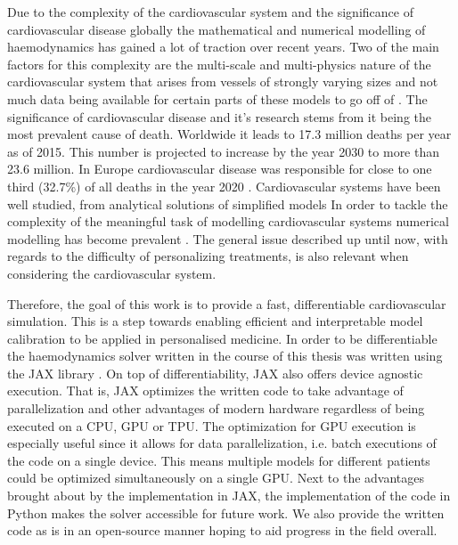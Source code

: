 \documentclass[a4paper, oneside]{discothesis}
\begin{document}
Due to the complexity of the cardiovascular system and the significance of cardiovascular disease globally the mathematical and numerical modelling of haemodynamics has gained a lot of traction over recent years.
Two of the main factors for this complexity are the multi-scale and multi-physics nature of the cardiovascular system that arises from vessels of strongly varying sizes and not much data being available for certain parts of these models to go off of \cite{quarteroni2016geometric}.
The significance of cardiovascular disease and it's research stems from it being the most prevalent cause of death.
Worldwide it leads to 17.3 million deaths per year as of 2015.
This number is projected to increase by the year 2030 to more than 23.6 million. \cite{update2015heart}
In Europe cardiovascular disease was responsible for close to one third (32.7\%) of all deaths in the year 2020 \cite{Coelho2020}.
Cardiovascular systems have been well studied, from analytical solutions of simplified models
In order to tackle the complexity of the meaningful task of modelling cardiovascular systems numerical modelling has become prevalent \cite{formaggia2009multiscale,quarteroni2016geometric,black2020p14,el2018investigating,qureshi2014numerical,reichold2009vascular}.
The general issue described up until now, with regards to the difficulty of personalizing treatments, is also relevant when considering the cardiovascular system.

Therefore, the goal of this work is to provide a fast, differentiable cardiovascular simulation.
This is a step towards enabling efficient and interpretable model calibration to be applied in personalised medicine.
In order to be differentiable the haemodynamics solver written in the course of this thesis was written using the JAX library \cite{jax}.
On top of differentiability, JAX also offers device agnostic execution.
That is, JAX optimizes the written code to take advantage of parallelization and other advantages of modern hardware regardless of being executed on a CPU, GPU or TPU.
The optimization for GPU execution is especially useful since it allows for data parallelization, i.e. batch executions of the code on a single device.
This means multiple models for different patients could be optimized simultaneously on a single GPU.
Next to the advantages brought about by the implementation in JAX, the implementation of the code in Python makes the solver accessible for future work.
We also provide the written code as is in an open-source manner hoping to aid progress in the field overall.
\end{document}
